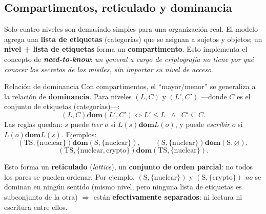 \documentclass[11pt,a4paper]{article}
\newcommand{\dom}{\mathrel{\mathbf{dom}}}        %
\begin{document}
\subsection{Compartimentos, reticulado y dominancia}
Solo cuatro niveles son demasiado simples para una organización real. El modelo agrega una
\textbf{lista de etiquetas} (categorías) que se asignan a sujetos y objetos; un
\textbf{nivel + lista de etiquetas} forma un \textbf{compartimento}. Esto implementa el
concepto de \textbf{\emph{need-to-know}}: \emph{un general a cargo de criptografía no tiene
por qué conocer los secretos de los misiles, sin importar su nivel de acceso}.

\begin{defbox}{Relación de dominancia}
Con compartimentos, el ``mayor/menor'' se generaliza a la relación de \textbf{dominancia}.
Para niveles $(L,C)$ y $(L',C')$ —donde $C$ es el conjunto de etiquetas (categorías)—:
\[
  (L,C) \dom (L',C') \iff L' \le L \;\;\wedge\;\; C' \subseteq C.
\]
Las reglas quedan: $s$ puede \emph{leer} $o$ si $L(s)\dom L(o)$, y puede \emph{escribir} $o$
si $L(o)\dom L(s)$. Ejemplos:
\[
  (\text{TS},\{\text{nuclear}\}) \dom (\text{S},\{\text{nuclear}\}), \qquad
  (\text{S},\{\text{nuclear}\}) \dom (\text{S},\varnothing),
\]
\[
  (\text{TS},\{\text{nuclear},\text{crypto}\}) \dom (\text{TS},\{\text{nuclear}\}).
\]
\end{defbox}

Esto forma un \textbf{reticulado} (\emph{lattice}), un \textbf{conjunto de orden parcial}:
no todos los pares se pueden ordenar. Por ejemplo, $(\text{S},\{\text{nuclear}\})$ y
$(\text{S},\{\text{crypto}\})$ \emph{no} se dominan en ningún sentido (mismo nivel, pero
ninguna lista de etiquetas es subconjunto de la otra) $\Rightarrow$ están
\textbf{efectivamente separados}: ni lectura ni escritura entre ellos.
\end{document}
